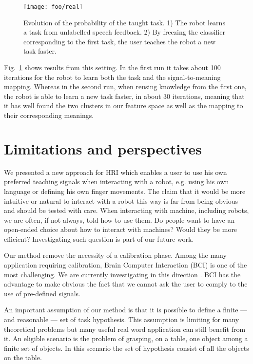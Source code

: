 \documentclass{acm_proc_article-sp}
\begin{document}
\begin{figure}[!h]
	\centering
		\texttt{[image: foo/real]}
	\caption{Evolution of the probability of the taught task. 1) The robot learns a task from unlabelled speech feedback. 2) By freezing the classifier corresponding to the first task, the user teaches the robot a new task faster.}
	\label{Real}
\end{figure}

Fig.~\ref{Real} shows results from this setting. In the first run it takes about 100 iterations for the robot to learn both the task and the signal-to-meaning mapping. Whereas in the second run, when reusing knowledge from the first one, the robot is able to learn a new task faster, in about 30 iterations, meaning that it has well found the two clusters in our feature space as well as the mapping to their corresponding meanings.

\section{Limitations and perspectives}

We presented a new approach for HRI which enables a user to use his own preferred teaching signals when interacting with a robot, e.g. using his own language or defining his own finger movements. The claim that it would be more intuitive or natural to interact with a robot this way is far from being obvious and should be tested with care. When interacting with machine, including robots, we are often, if not always, told how to use them. Do people want to have an open-ended choice about how to interact with machines? Would they be more efficient? Investigating such question is part of our future work.

Our method remove the necessity of a calibration phase. Among the many application requiring calibration, Brain Computer Interaction (BCI) is one of the most challenging. We are currently investigating in this direction \cite{grizou2013zero}. BCI has the advantage to make obvious the fact that we cannot ask the user to comply to the use of pre-defined signals.

An important assumption of our method is that it is possible to define a finite --- and reasonable --- set of task hypothesis. This assumption is limiting for many theoretical problems but many useful real word application can still benefit from it. An eligible scenario is the problem of grasping, on a table, one object among a finite set of objects. In this scenario the set of hypothesis consist of all the objects on the table.
\end{document}
